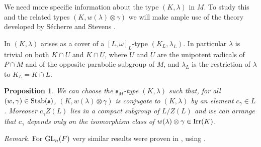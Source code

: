 \documentclass[11pt]{amsart}
\newtheorem{prop}[thm]{Proposition}
\theoremstyle{definition}
\begin{document}
We need more specific information about the type $(K,\lambda)$ in $M$. To study this and 
the related types $(K,w(\lambda) \otimes \gamma)$  we will make ample use of the theory 
developed by S\'echerre and Stevens \cite{Sec3,SeSt4,SeSt6}.

In \cite{Sec3} $(K,\lambda)$ arises as a cover of a $[L,\omega]_L$-type $(K_L,\lambda_L)$.
In particular $\lambda$ is trivial on both $K \cap U$ \label{i:83}
and $K \cap \overline{U}$, where $U$ and $\overline{U}$ are the unipotent radicals of
$P \cap M$ and of the opposite parabolic subgroup of $M$, and $\lambda_L$ is the 
restriction of $\lambda$ to $K_L = K \cap L$.

\begin{prop}\label{prop:3.3}
We can choose the ${{\mathfrak s}}_M$-type $(K,\lambda)$ such that, for all 
$(w,\gamma) \in {{\rm Stab}} ({{\mathfrak s}})$, $(K,w(\lambda) \otimes \gamma)$ is conjugate to 
$(K,\lambda)$ by an element \label{i:c} $c_\gamma \in L$. Moreover $c_\gamma Z(L)$ lies in a compact 
subgroup of $L / Z(L)$ and we can arrange that $c_\gamma$ depends only on the isomorphism 
class of $w (\lambda) \otimes \gamma \in {{\rm Irr}} (K)$.
\end{prop}
\emph{Remark.} For ${{\rm GL}}_n (F)$ very similar results were proven in \cite[\S 4.2]{GoRo1},
using \cite{BuKu4}. 
\end{document}
